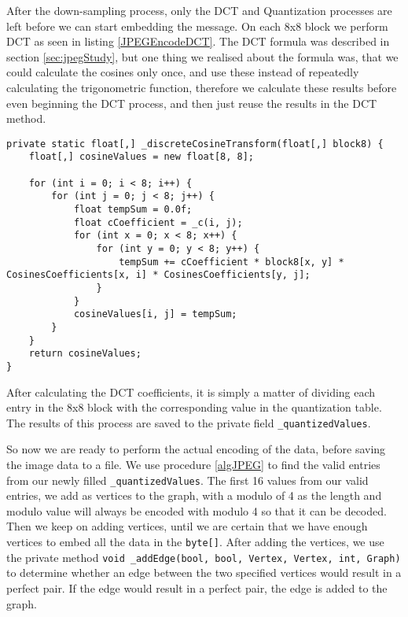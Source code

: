After the down-sampling process, only the DCT and Quantization processes are left before we can start embedding the message.
On each 8x8 block we perform DCT as seen in listing \ref{JPEGEncodeDCT}.
The DCT formula was described in section \ref{sec:jpegStudy}, but one thing we realised about the formula was, that we could calculate the cosines only once, and use these instead of repeatedly calculating the trigonometric function, therefore we calculate these results before even beginning the DCT process, and then just reuse the results in the DCT method.
 

\begin{lstlisting}[firstnumber=603,label=JPEGEncodeDCT]
private static float[,] _discreteCosineTransform(float[,] block8) {
    float[,] cosineValues = new float[8, 8];

    for (int i = 0; i < 8; i++) {
        for (int j = 0; j < 8; j++) {
            float tempSum = 0.0f;
            float cCoefficient = _c(i, j);
            for (int x = 0; x < 8; x++) {
                for (int y = 0; y < 8; y++) {
                    tempSum += cCoefficient * block8[x, y] * CosinesCoefficients[x, i] * CosinesCoefficients[y, j];
                }
            }
            cosineValues[i, j] = tempSum;
        }
    }
    return cosineValues;
}
\end{lstlisting}

After calculating the DCT coefficients, it is simply a matter of dividing each entry in the 8x8 block with the corresponding value in the quantization table.
The results of this process are saved to the private field \lstinline|_quantizedValues|.

So now we are ready to perform the actual encoding of the data, before saving the image data to a file.
We use procedure \ref{algJPEG} to find the valid entries from our newly filled \lstinline|_quantizedValues|.
The first 16 values from our valid entries, we add as vertices to the graph, with a modulo of 4 as the length and modulo value will always be encoded with modulo 4 so that it can be decoded.
Then we keep on adding vertices, until we are certain that we have enough vertices to embed all the data in the \lstinline|byte[]|.
After adding the vertices, we use the private method \lstinline|void _addEdge(bool, bool, Vertex, Vertex, int, Graph)| to determine whether an edge between the two specified vertices would result in a perfect pair.
If the edge would result in a perfect pair, the edge is added to the graph.

